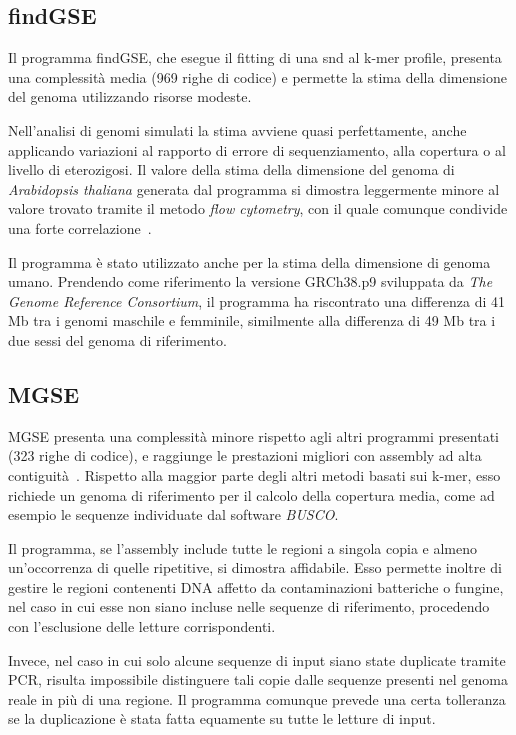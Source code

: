 \documentclass[crop=false, class=book]{standalone}
\begin{document}
	
	\subsection{findGSE}
	Il programma findGSE, che esegue il \gls{fitting} di una \gls{snd} al k-mer profile, presenta una complessità media (969 righe di codice) e permette la stima della dimensione del genoma utilizzando risorse modeste. 
	
	Nell'analisi di genomi simulati la stima avviene quasi perfettamente, anche applicando variazioni al rapporto di errore di sequenziamento, alla copertura o al livello di eterozigosi. Il valore della stima della dimensione del genoma di \textit{Arabidopsis thaliana} generata dal programma si dimostra leggermente minore al valore trovato tramite il metodo \textit{flow cytometry}, con il quale comunque condivide una forte correlazione~\cite{sun2017findGSE}. 
	
	Il programma è stato utilizzato anche per la stima della dimensione di genoma umano. Prendendo come riferimento la versione GRCh38.p9 sviluppata da \textit{The Genome Reference Consortium}, il programma ha riscontrato una differenza di 41 Mb tra i genomi maschile e femminile, similmente alla differenza di 49 Mb tra i due sessi del genoma di riferimento.
	
	\subsection{MGSE}
	MGSE presenta una complessità minore rispetto agli altri programmi presentati (323 righe di codice), e raggiunge le prestazioni migliori con assembly ad alta contiguità~\cite{pucker2019MGSE}. Rispetto alla maggior parte degli altri metodi basati sui k-mer, esso richiede un genoma di riferimento per il calcolo della copertura media, come ad esempio le sequenze individuate dal software \textit{BUSCO}. 
	
	Il programma, se l'assembly include tutte le regioni a singola copia e almeno un'occorrenza di quelle ripetitive, si dimostra affidabile. Esso permette inoltre di gestire le regioni contenenti DNA affetto da contaminazioni batteriche o fungine, nel caso in cui esse non siano incluse nelle sequenze di riferimento, procedendo con l'esclusione delle letture corrispondenti. 
	
	Invece, nel caso in cui solo alcune sequenze di input siano state duplicate tramite PCR, risulta impossibile distinguere tali copie dalle sequenze presenti nel genoma reale in più di una regione. Il programma comunque prevede una certa tolleranza se la duplicazione è stata fatta equamente su tutte le letture di input.


	
\end{document}
